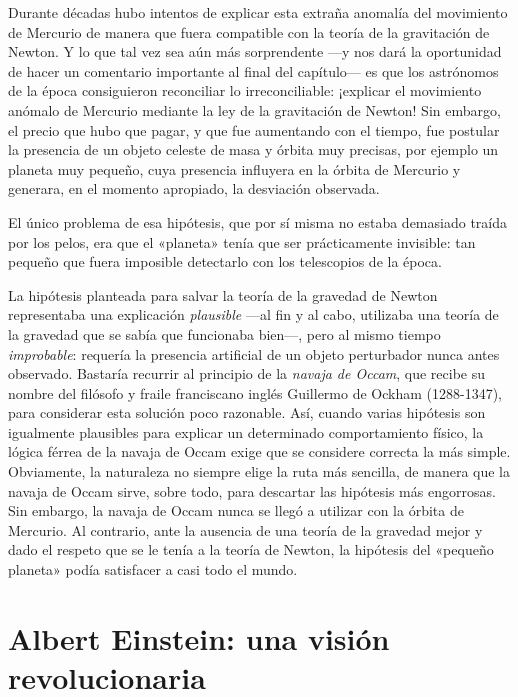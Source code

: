 Durante décadas hubo intentos de explicar esta extraña anomalía del movimiento
de Mercurio de manera que fuera compatible con la teoría de la gravitación de
Newton. Y lo que tal vez sea aún más sorprendente ---y nos dará la oportunidad
de hacer un comentario importante al final del capítulo--- es que los astrónomos
de la época consiguieron reconciliar lo irreconciliable: ¡explicar el movimiento
anómalo de Mercurio mediante la ley de la gravitación de Newton! Sin embargo,
el precio que hubo que pagar, y que fue aumentando con el tiempo, fue postular
la presencia de un objeto celeste de masa y órbita muy precisas, por ejemplo
un planeta muy pequeño, cuya presencia influyera en la órbita de Mercurio y
generara, en el momento apropiado, la desviación observada.

El único problema de esa hipótesis, que por sí misma no estaba demasiado traída
por los pelos, era que el «planeta» tenía que ser prácticamente invisible:
tan pequeño que fuera imposible detectarlo con los telescopios de la época.

La hipótesis planteada para salvar la teoría de la gravedad de Newton representaba
una explicación \emph{plausible} ---al fin y al cabo, utilizaba una teoría de la
gravedad que se sabía que funcionaba bien---, pero al mismo tiempo \emph{improbable}:
requería la presencia artificial de un objeto perturbador nunca antes observado.
Bastaría recurrir al principio de la \emph{navaja de Occam}, que recibe su nombre
del filósofo y fraile franciscano inglés Guillermo de Ockham (1288-1347), para
considerar esta solución poco razonable. Así, cuando varias hipótesis son igualmente
plausibles para explicar un determinado comportamiento físico, la lógica férrea
de la navaja de Occam exige que se considere correcta la más simple. Obviamente,
la naturaleza no siempre elige la ruta más sencilla, de manera que la navaja de
Occam sirve, sobre todo, para descartar las hipótesis más engorrosas. Sin embargo,
la navaja de Occam nunca se llegó a utilizar con la órbita de Mercurio. Al contrario,
ante la ausencia de una teoría de la gravedad mejor y dado el respeto que se le
tenía a la teoría de Newton, la hipótesis del «pequeño planeta» podía satisfacer
a casi todo el mundo.

\section{Albert Einstein: una visión revolucionaria}\label{sec:02-einstein}

